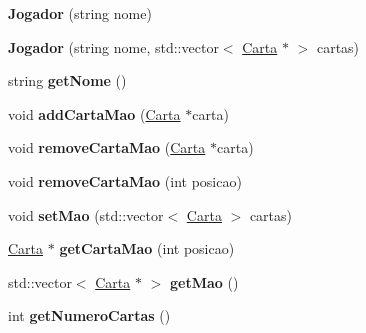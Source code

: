 \begin{DoxyCompactItemize}
\item 
\mbox{\label{class_jogador_a166616aae3af6eefcc804a70d70f1359}} 
{\bfseries Jogador} (string nome)
\item 
\mbox{\label{class_jogador_a2c4a7000bda1bf0390b3b00c1066a71f}} 
{\bfseries Jogador} (string nome, std\+::vector$<$ \mbox{\hyperlink{class_carta}{Carta}} $\ast$ $>$ cartas)
\item 
\mbox{\label{class_jogador_ad99c974eb0be82064fbca936adc246d9}} 
string {\bfseries get\+Nome} ()
\item 
\mbox{\label{class_jogador_a01b6af5be0bb3789d1450f8a8f0e99d4}} 
void {\bfseries add\+Carta\+Mao} (\mbox{\hyperlink{class_carta}{Carta}} $\ast$carta)
\item 
\mbox{\label{class_jogador_ab835948a3cc9f4876e8d5a417b8c4d2f}} 
void {\bfseries remove\+Carta\+Mao} (\mbox{\hyperlink{class_carta}{Carta}} $\ast$carta)
\item 
\mbox{\label{class_jogador_a9c9a6a3b7460ccd81b800211ead01da2}} 
void {\bfseries remove\+Carta\+Mao} (int posicao)
\item 
\mbox{\label{class_jogador_aa4efb1bca8f98a41f38397f8a2d34107}} 
void {\bfseries set\+Mao} (std\+::vector$<$ \mbox{\hyperlink{class_carta}{Carta}} $>$ cartas)
\item 
\mbox{\label{class_jogador_a5b275f62c069fced9f4e2bb4f575c8c4}} 
\mbox{\hyperlink{class_carta}{Carta}} $\ast$ {\bfseries get\+Carta\+Mao} (int posicao)
\item 
\mbox{\label{class_jogador_a653a6a493cce26a6ad32b9fefef8a47c}} 
std\+::vector$<$ \mbox{\hyperlink{class_carta}{Carta}} $\ast$ $>$ {\bfseries get\+Mao} ()
\item 
\mbox{\label{class_jogador_acb6af0751dae0c4598c6917e3a3eec0c}} 
int {\bfseries get\+Numero\+Cartas} ()
\item 
\mbox{\label{class_jogador_a938aa676a62494ce8b0eff5698fcf7eb}} 

\end{DoxyCompactItemize}
